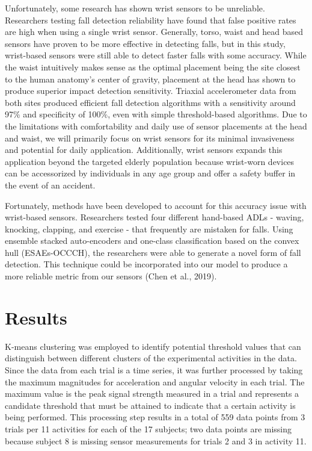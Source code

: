 \documentclass{llncs}
\begin{document}
	Unfortunately, some research has shown wrist sensors to be unreliable. Researchers testing fall detection reliability have found that false positive rates are high when using a single wrist sensor.\cite{gjoreski2016accurately} Generally, torso, waist and head based sensors have proven to be more effective in detecting falls, but in this study, wrist-based sensors were still able to detect faster falls with some accuracy. While the waist intuitively makes sense as the optimal placement being the site closest to the human anatomy's center of gravity, placement at the head has shown to produce superior impact detection sensitivity. Triaxial accelerometer data from both sites produced efficient fall detection algorithms with a sensitivity around 97\% and specificity of 100\%, even with simple threshold-based algorithms.\cite{kangas2008comparison} Due to the limitations with comfortability and daily use of sensor placements at the head and waist, we will primarily focus on wrist sensors for its minimal invasiveness and potential for daily application. Additionally, wrist sensors expands this application beyond the targeted elderly population because wrist-worn devices can be accessorized by individuals in any age group and offer a safety buffer in the event of an accident.
	
	Fortunately, methods have been developed to account for this accuracy issue with wrist-based sensors. Researchers tested four different hand-based ADLs - waving, knocking, clapping, and exercise - that frequently are mistaken for falls. Using ensemble stacked auto-encoders and one-class classification based on the convex hull (ESAEs-OCCCH), the researchers were able to generate a novel form of fall detection. This technique could be incorporated into our model to produce a more reliable metric from our sensors (Chen et al., 2019). \cite{chen2019method}


\section{Results}

K-means clustering was employed to identify potential threshold values that can distinguish between different clusters of the experimental activities in the data. Since the data from each trial is a time series, it was further processed  
by taking the maximum magnitudes for acceleration and angular velocity in each trial. The maximum value is the peak signal strength measured in a trial and represents a candidate threshold that must be attained to indicate that a certain activity is being performed. This processing step results in a total of 559 data points from 3 trials per 11 activities for each of the 17 subjects; two data points are missing because subject 8 is missing sensor measurements for trials 2 and 3 in activity 11.
\end{document}
